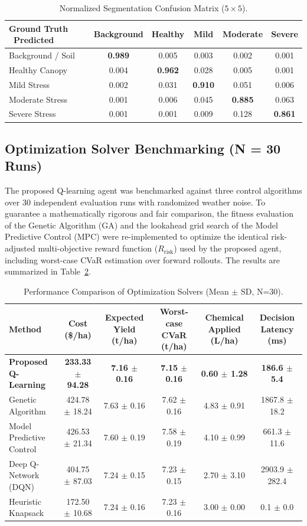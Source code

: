 \documentclass[review,3p,times,authoryear]{elsarticle}
\begin{document}
\begin{table}[H]
\centering
\caption{Normalized Segmentation Confusion Matrix ($5 \times 5$).}
\label{tab:confusion_matrix}
\begin{tabular}{lccccc}
\toprule
Ground Truth \ Predicted & Background & Healthy & Mild & Moderate & Severe \\
\midrule
Background / Soil & \textbf{0.989} & 0.005 & 0.003 & 0.002 & 0.001 \\
Healthy Canopy & 0.004 & \textbf{0.962} & 0.028 & 0.005 & 0.001 \\
Mild Stress & 0.002 & 0.031 & \textbf{0.910} & 0.051 & 0.006 \\
Moderate Stress & 0.001 & 0.006 & 0.045 & \textbf{0.885} & 0.063 \\
Severe Stress & 0.001 & 0.001 & 0.009 & 0.128 & \textbf{0.861} \\
\bottomrule
\end{tabular}
\end{table}

\subsection{Optimization Solver Benchmarking (N = 30 Runs)}
The proposed Q-learning agent was benchmarked against three control algorithms over 30 independent evaluation runs with randomized weather noise. To guarantee a mathematically rigorous and fair comparison, the fitness evaluation of the Genetic Algorithm (GA) and the lookahead grid search of the Model Predictive Control (MPC) were re-implemented to optimize the identical risk-adjusted multi-objective reward function ($R_\text{risk}$) used by the proposed agent, including worst-case CVaR estimation over forward rollouts. The results are summarized in Table~\ref{tab:benchmarks}.

\begin{table}[H]
\centering
\caption{Performance Comparison of Optimization Solvers (Mean $\pm$ SD, N=30).}
\label{tab:benchmarks}
\begin{tabular}{lccccc}
\toprule
Method & Cost (\$/ha) & Expected Yield (t/ha) & Worst-case CVaR (t/ha) & Chemical Applied (L/ha) & Decision Latency (ms) \\
\midrule
\textbf{Proposed Q-Learning} & \textbf{233.33 $\pm$ 94.28} & \textbf{7.16 $\pm$ 0.16} & \textbf{7.15 $\pm$ 0.16} & \textbf{0.60 $\pm$ 1.28} & \textbf{186.6 $\pm$ 5.4} \\
Genetic Algorithm & 424.78 $\pm$ 18.24 & 7.63 $\pm$ 0.16 & 7.62 $\pm$ 0.16 & 4.83 $\pm$ 0.91 & 1867.8 $\pm$ 18.2 \\
Model Predictive Control & 426.53 $\pm$ 21.34 & 7.60 $\pm$ 0.19 & 7.58 $\pm$ 0.19 & 4.10 $\pm$ 0.99 & 661.3 $\pm$ 11.6 \\
Deep Q-Network (DQN) & 404.75 $\pm$ 87.03 & 7.24 $\pm$ 0.15 & 7.23 $\pm$ 0.15 & 2.70 $\pm$ 3.10 & 2903.9 $\pm$ 282.4 \\
Heuristic Knapsack & 172.50 $\pm$ 10.68 & 7.24 $\pm$ 0.16 & 7.23 $\pm$ 0.16 & 3.00 $\pm$ 0.00 & 0.1 $\pm$ 0.0 \\
\bottomrule
\end{tabular}
\end{table}
\end{document}
